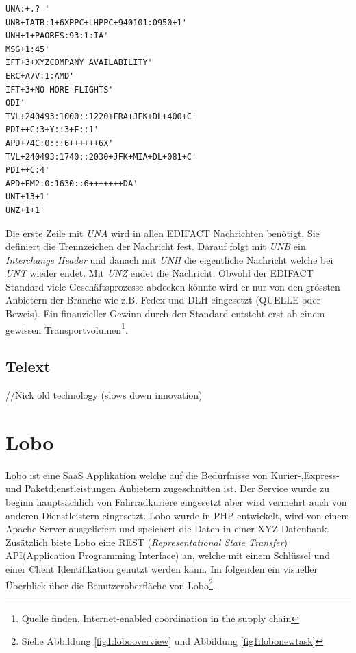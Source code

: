 \begin{verbatim}
UNA:+.? '
UNB+IATB:1+6XPPC+LHPPC+940101:0950+1'
UNH+1+PAORES:93:1:IA'
MSG+1:45'
IFT+3+XYZCOMPANY AVAILABILITY'
ERC+A7V:1:AMD'
IFT+3+NO MORE FLIGHTS'
ODI'
TVL+240493:1000::1220+FRA+JFK+DL+400+C'
PDI++C:3+Y::3+F::1'
APD+74C:0:::6++++++6X'
TVL+240493:1740::2030+JFK+MIA+DL+081+C'
PDI++C:4'
APD+EM2:0:1630::6+++++++DA'
UNT+13+1'
UNZ+1+1'
\end{verbatim}
Die erste Zeile mit \textit{UNA} wird in allen EDIFACT Nachrichten benötigt. Sie definiert die Trennzeichen der Nachricht fest. Darauf folgt mit \textit{UNB} ein \textit{Interchange Header} und danach mit \textit{UNH} die eigentliche Nachricht welche bei \textit{UNT} wieder endet. Mit \textit{UNZ} endet die Nachricht.
\newline{}
Obwohl der EDIFACT Standard viele Geschäftsprozesse abdecken könnte wird er nur von den grössten Anbietern der Branche wie z.B. Fedex und DLH eingesetzt (QUELLE oder Beweis). Ein finanzieller Gewinn durch den Standard entsteht erst ab einem gewissen Transportvolumen\footnote{Quelle finden. Internet-enabled coordination in the supply chain}.

\subsection{Telext}
//Nick old technology (slows down innovation)


\section{Lobo}
Lobo ist eine SaaS Applikation welche auf die Bedürfnisse von Kurier-,Express- und Paketdienstleistungen Anbietern zugeschnitten ist. Der Service wurde zu beginn hauptsächlich von Fahrradkuriere eingesetzt aber wird vermehrt auch von anderen Dienstleistern eingesetzt. Lobo wurde in PHP entwickelt, wird von einem Apache Server ausgeliefert und speichert die Daten in einer XYZ Datenbank. Zusätzlich biete Lobo eine REST (\textit{Representational State Transfer}) API(Application Programming Interface) an, welche mit einem Schlüssel und einer Client Identifikation genutzt werden kann. Im folgenden ein visueller Überblick über die Benutzeroberfläche von Lobo\footnote{Siehe Abbildung \ref{fig1:lobooverview} und Abbildung \ref{fig1:lobonewtask}}.

